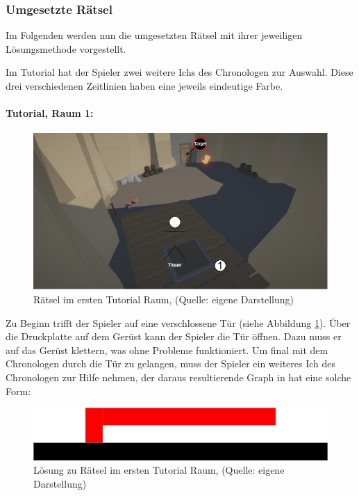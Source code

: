 \subsubsection{Umgesetzte Rätsel}
Im Folgenden werden nun die umgesetzten Rätsel mit ihrer jeweiligen Lösungsmethode vorgestellt. 

Im Tutorial hat der Spieler zwei weitere Ichs des Chronologen zur Auswahl. Diese drei verschiedenen Zeitlinien haben eine jeweils eindeutige Farbe.

\paragraph{Tutorial, Raum 1:}

\begin{figure}[ht]
\centering
\includegraphics[width=0.8\linewidth]{content/pictures/Raetsel-L01_R01_R01.jpg}
\caption{Rätsel im ersten Tutorial Raum, (Quelle: eigene Darstellung)}
\label{fig:L01_R01_R01}
\end{figure}

Zu Beginn trifft der Spieler auf eine verschlossene Tür (siehe Abbildung \ref{fig:L01_R01_R01}). Über die Druckplatte auf dem Gerüst kann der Spieler die Tür öffnen. Dazu muss er auf das Gerüst klettern, was ohne Probleme funktioniert. Um final mit dem Chronologen durch die Tür zu gelangen, muss der Spieler ein weiteres Ich des Chronologen zur Hilfe nehmen, der daraus resultierende Graph in  hat eine solche Form:

\begin{figure}[ht]
\centering
\includegraphics[width=0.6\linewidth]{content/pictures/Raetsel-L01_R01_R01_Loesung.jpg}
\caption{Lösung zu Rätsel im ersten Tutorial Raum, (Quelle: eigene Darstellung)}
\label{fig:L01_R01_R01_L}
\end{figure}

